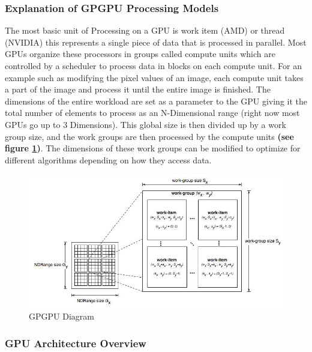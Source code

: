 \documentclass[a4paper,10pt]{article}
\begin{document}
\subsubsection{Explanation of GPGPU Processing Models}
The most basic unit of Processing on a GPU is work item (AMD) or thread (NVIDIA) this represents a single piece of data that is processed in parallel. Most GPUs organize these processors in groups called 
compute units which are controlled by a scheduler to process data in blocks on each compute unit. For an example such as modifying the pixel values of an image, each compute unit takes a part of the image 
and process it until the entire image is finished. The dimensions of the entire workload are set as a parameter to the GPU giving it the total number of elements to process as an N-Dimensional range (right 
now most GPUs go up to 3 Dimensions). This global size is then divided up by a work group size, and the work groups are then processed by the compute units \textbf{ (see figure \ref{fig:gpu})}. The dimensions of these work groups 
can be modified to optimize for different algorithms depending on how they access data. 
	\begin{figure}[H]
	\includegraphics[width=\linewidth,height=\paperheight,keepaspectratio]{gpgpu.jpg}
	\caption{GPGPU Diagram}
	\label{fig:gpu}
	\end{figure}
\pagebreak

\subsubsection{GPU Architecture Overview}
\end{document}
